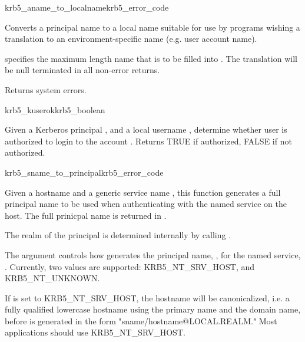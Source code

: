 \begin{funcdecl}{krb5_aname_to_localname}{krb5_error_code}{\funcin}
\funcout
{}
\end{funcdecl}

Converts a principal name  to a local name suitable for use by
programs wishing a translation to an environment-specific name (e.g.
user account name).

 specifies the maximum length name that is to be filled into
.
The translation will be null terminated in all non-error returns.

Returns system errors.

\begin{funcdecl}{krb5_kuserok}{krb5_boolean}{\funcin}
\end{funcdecl}

Given a Kerberos principal , and a local username
,
determine whether user is authorized to login to the account .
Returns TRUE if authorized, FALSE if not authorized.

\begin{funcdecl}{krb5_sname_to_principal}{krb5_error_code}{\funcin}
\funcout
{}
\end{funcdecl}

Given a hostname  and a generic service name
, this function generates a full principal name to be
used when authenticating with the named service on the host.  The full
prinicpal name is  returned  in .

The realm of the
principal is determined internally by calling .

The  argument controls how
 generates the principal name,
, for the named service, .
Currently, two values 	are supported: KRB5_NT_SRV_HOST, and
KRB5_NT_UNKNOWN.  

If  is set to
KRB5_NT_SRV_HOST, the hostname will be
canonicalized, i.e. a fully qualified lowercase hostname using
the primary name and the domain name, before  is
generated in the form
"sname/hostname@LOCAL.REALM." Most applications should use
KRB5_NT_SRV_HOST.  

